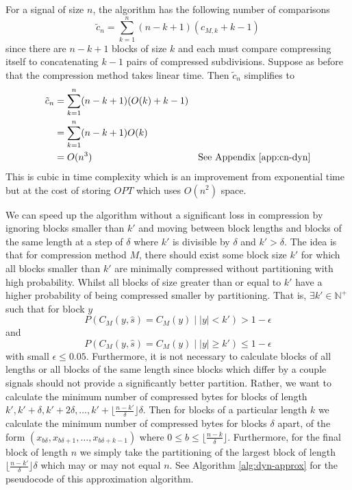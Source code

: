 

For a signal of size $n$, the algorithm has the following number of comparisons
\[ \tilde c_n = \sum_{k=1}^n(n-k+1)(c_{M,k}+k-1) \]
since there are $n-k+1$ blocks of size $k$ and each must compare compressing
itself to concatenating $k-1$ pairs of compressed subdivisions.
Suppose as before that the compression method takes linear time. Then $\tilde c_n$ simplifies to
\begin{align*}
	\tilde c_n &= \sum_{k=1}^n(n-k+1)(O(k)+k-1)\\
	&= \sum_{k=1}^n(n-k+1)O(k)\\
	&= O(n^3) &\text{See Appendix \ref{app:cn-dyn}}
\end{align*}
This is cubic in time complexity which is an improvement from exponential time
but at the cost of storing $OPT$ which uses $O(n^2)$ space.


We can speed up the algorithm without a significant loss in compression by
ignoring blocks smaller than $k'$ and moving between block lengths and blocks of
the same length at a step of $\delta$ where $k'$ is divisible by $\delta$ and
$k'>\delta$.
The idea is that for compression method $M$, there should exist some block size
$k'$ for which all blocks smaller than $k'$ are minimally compressed without
partitioning with high probability. Whilst all blocks of size greater than or
equal to $k'$ have a higher probability of being compressed smaller by
partitioning.
That is, $\exists k'\in\mathbb{N}^+$ such that for block $y$
\[ P(C_M(y,\hat s)=C_M(y)\mid |y|<k')> 1-\epsilon\]
and
\[ P(C_M(y,\hat s)=C_M(y)\mid |y|\ge k')\le 1-\epsilon\]
with small $\epsilon \le 0.05$.
Furthermore, it is not necessary to calculate blocks of all lengths or all
blocks of the same length since blocks which differ by a couple signals should
not provide a significantly better partition.
Rather, we want to calculate the minimum
number of compressed bytes for blocks of length
$k',k'+\delta,k'+2\delta,\dots,k' + \lfloor\frac{n-k'}{\delta}\rfloor\delta$.
Then for blocks of a particular length $k$ we calculate the minimum number of
compressed bytes for blocks $\delta$ apart, of the form
$(x_{b\delta},x_{b\delta+1},\dots,x_{b\delta+k-1})$ where $0\le b\le \lfloor \frac{n-k}{\delta} \rfloor$.
Furthermore, for the final block of length $n$ we simply take the partitioning
of the largest block of length $\lfloor \frac{n-k'}{\delta}\rfloor\delta$ which
may or may not equal $n$. See Algorithm \ref{alg:dyn-approx} for the pseudocode
of this approximation algorithm.

